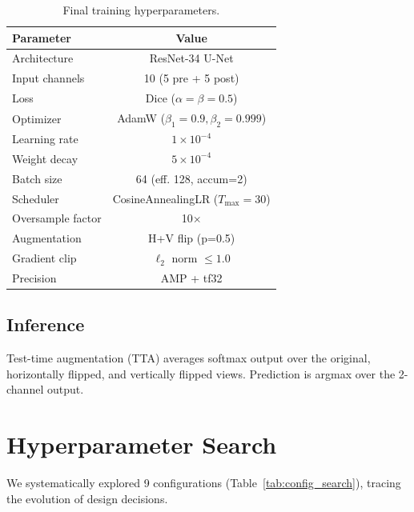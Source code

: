 \documentclass[twocolumn]{article}
\begin{document}
\begin{table}[ht]
\centering
\caption{Final training hyperparameters.}
\label{tab:hyperparams}
\begin{tabular}{lc}
\toprule
Parameter & Value \\
\midrule
Architecture & ResNet-34 U-Net \\
Input channels & 10 (5 pre + 5 post) \\
Loss & Dice ($\alpha=\beta=0.5$) \\
Optimizer & AdamW ($\beta_1=0.9,\beta_2=0.999$) \\
Learning rate & $1\times10^{-4}$ \\
Weight decay & $5\times10^{-4}$ \\
Batch size & 64 (eff. 128, accum=2) \\
Scheduler & CosineAnnealingLR ($T_{\max}=30$) \\
Oversample factor & 10$\times$ \\
Augmentation & H+V flip (p=0.5) \\
Gradient clip & $\ell_2$ norm $\leq 1.0$ \\
Precision & AMP + tf32 \\
\bottomrule
\end{tabular}
\end{table}

\subsection{Inference}
Test-time augmentation (TTA) averages softmax output over the 
original, horizontally flipped, and vertically flipped views.  
Prediction is argmax over the 2-channel output.

\section{Hyperparameter Search}
\label{sec:search}
We systematically explored 9 configurations (Table~\ref{tab:config_search}), 
tracing the evolution of design decisions.
\end{document}
